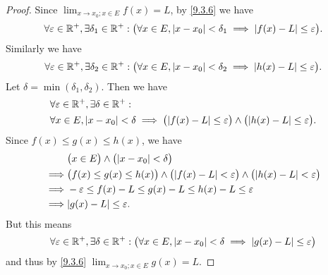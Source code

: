 \begin{proof}
  Since \(\lim_{x \to x_0 ; x \in E} f(x) = L\), by \cref{9.3.6} we have
  \[
    \forall \varepsilon \in \mathbb{R}^+, \exists \delta_1 \in \mathbb{R}^+ : \big(\forall x \in E, \left\lvert x - x_0\right\rvert < \delta_1 \implies \left\lvert f(x) - L\right\rvert \leq \varepsilon\big).
  \]
  Similarly we have
  \[
    \forall \varepsilon \in \mathbb{R}^+, \exists \delta_2 \in \mathbb{R}^+ : \big(\forall x \in E, \left\lvert x - x_0\right\rvert < \delta_2 \implies \left\lvert h(x) - L\right\rvert \leq \varepsilon\big).
  \]
  Let \(\delta = \min(\delta_1, \delta_2)\).
  Then we have
  \begin{align*}
     & \forall \varepsilon \in \R^+, \exists \delta \in \R^+ :                                                                                     \\
     & \forall x \in E, \abs{x - x_0} < \delta \implies \big(\abs{f(x) - L} \leq \varepsilon\big) \land \big(\abs{h(x) - L} \leq \varepsilon\big).
  \end{align*}
  Since \(f(x) \leq g(x) \leq h(x)\), we have
  \begin{align*}
             & \big(x \in E\big) \land \big(\abs{x - x_0} < \delta\big)                                                                     \\
    \implies & \big(f(x) \leq g(x) \leq h(x)\big) \land \big(\abs{f(x) - L} < \varepsilon\big) \land \big(\abs{h(x) - L} < \varepsilon\big) \\
    \implies & -\varepsilon \leq f(x) - L \leq g(x) - L \leq h(x) - L \leq \varepsilon                                                      \\
    \implies & \abs{g(x) - L} \leq \varepsilon.
  \end{align*}
  But this means
  \[
    \forall \varepsilon \in \mathbb{R}^+, \exists \delta \in \mathbb{R}^+ : \big(\forall x \in E, \left\lvert x - x_0\right\rvert < \delta \implies \left\lvert g(x) - L\right\rvert \leq \varepsilon\big)
  \]
  and thus by \cref{9.3.6} \(\lim_{x \to x_0 ; x \in E} g(x) = L\).
\end{proof}